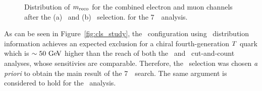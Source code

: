 \begin{figure}[htb]\begin{center}
	\caption[bla]{Distribution of $m_{\rm reco}$  for the combined electron and muon channels after the (a) \loose\ and (b) \tight\ selection.
        for the 7~\tev\ analysis.%
        \label{fig:mrecoBIS}}
\end{center}\end{figure}

As can be seen in Figure~\ref{fig:cls_study}, the \tight\ configuration using 
\mreco\ distribution information achieves an expected
exclusion for a chiral fourth-generation $\T$ quark which is $\sim 50\gev$ 
higher than the reach of both the
\loose\ and \tight\ cut-and-count analyses, whose sensitivies are comparable.
Therefore, the \tight\ selection was chosen 
{\it a priori} to obtain the main result of the 7~\tev\ search.
The same argument is considered to hold for the \wbx\ analysis.

